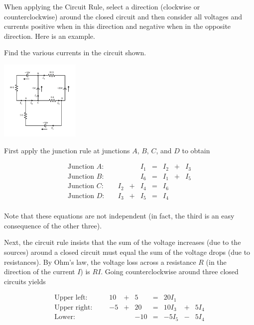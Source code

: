 \documentclass{ximera}
\begin{document}
When applying the Circuit Rule, select a direction (clockwise or counterclockwise) around the closed circuit and then consider all voltages and currents positive when in this direction
and negative when in the opposite direction. %
Here is an example.

\begin{example}\label{001817}

Find the various currents in the circuit shown.

\begin{image}
   
\includegraphics[height=1.5in]{circuit8.jpg}~
 
\end{image}

\begin{explanation}
  First apply the junction rule at junctions $A$, $B$, $C$, and $D$ to obtain


$$\begin{array}{lccccccc}
	\mbox{Junction } A:\quad &&& I_1 & = & I_2 &+& I_3 \\
	\mbox{Junction } B:\quad &&& I_6 & = & I_1 &+& I_5 \\
	\mbox{Junction } C:\quad & I_2 &+& I_4 & = & I_6 && \\
	\mbox{Junction } D:\quad & I_3 &+& I_5 & = & I_4&& \\
\end{array}$$

Note that these equations are not independent (in fact, the third is an easy consequence of the other three).

Next, the circuit rule insists that the sum of the voltage increases (due to the sources) around a closed circuit must equal the sum of the voltage drops (due to resistances). By Ohm's law, the voltage loss across a resistance $R$ (in the direction of the current $I$) is $RI$. Going counterclockwise around three closed circuits yields

$$\begin{array}{lcccccccc}
	\mbox{Upper left: } \quad\quad  &10 & + & 5 & = & 20I_1 && \\
	\mbox{Upper right: } &-5 & +& 20 & = & 10I_3& +& 5I_4 \\
	\mbox{Lower: } && &-10 & = & -5I_5 &-& 5I_4 \\
\end{array}$$


\end{explanation}
\end{example}
\end{document}
